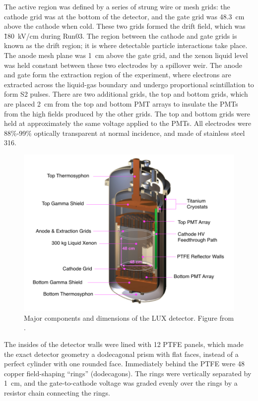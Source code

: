 The active region was defined by a series of strung wire or mesh grids: the cathode grid was at the bottom of the detector, and the gate grid was 48.3~cm above the cathode when cold. These two grids formed the drift field, which was \~180~kV/cm during Run03. The region between the cathode and gate grids is known as the drift region; it is where detectable particle interactions take place. The anode mesh plane was 1~cm above the gate grid, and the xenon liquid level was held constant between these two electrodes by a spillover weir. The anode and gate form the extraction region of the experiment, where electrons are extracted across the liquid-gas boundary and undergo proportional scintillation to form S2 pulses. There are two additional grids, the top and bottom grids, which are placed 2~cm from the top and bottom \ac{PMT} arrays to insulate the \ac{PMT}s from the high fields produced by the other grids. The top and bottom grids were held at approximately the same voltage applied to the \ac{PMT}s. All electrodes were 88\%-99\% optically transparent at normal incidence, and made of stainless steel 316.

\begin{figure}[htbp]
\begin{center}
\includegraphics[width=\textwidth]{figures/lux/lux_inner1.png}
\caption{Major components and dimensions of the \acs{LUX} detector. Figure from \cite{LUXDetectorPaper}. }
\label{fig:lux1}
\end{center}
\end{figure}


The insides of the detector walls were lined with 12 \ac{PTFE} panels, which made the exact detector geometry a dodecagonal prism with flat faces, instead of a perfect cylinder with one rounded face. Immediately behind the \ac{PTFE} were 48 copper field-shaping ``rings'' (dodecagons). The rings were vertically separated by 1~cm, and the gate-to-cathode voltage was graded evenly over the rings by a resistor chain connecting the rings. 


